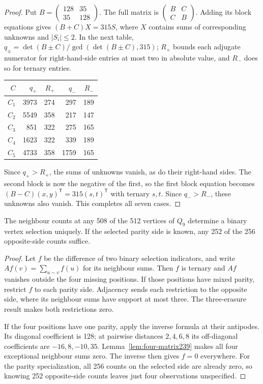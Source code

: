 \begin{proof}
Put $B=\left(\begin{smallmatrix}128&35\\35&128\end{smallmatrix}\right)$.
The full matrix is $\left(\begin{smallmatrix}B&C\\C&B\end{smallmatrix}\right)$.
Adding its block equations gives $(B+C)X=315S$, where $X$ contains
sums of corresponding unknowns and $|S_i|\le2$. In the next table,
$q_\pm=\det(B\pm C)/\gcd(\det(B\pm C),315)$;
$R_+$ bounds each adjugate numerator for right-hand-side entries at
most two in absolute value, and $R_-$ does so for ternary entries.
\begin{center}
\begin{tabular}{rrrrr}
\toprule
$C$ & $q_+$ & $R_+$ & $q_-$ & $R_-$\\
\midrule
$C_1$ & 3973 & 274 & 297 & 189\\
$C_2$ & 5549 & 358 & 217 & 147\\
$C_3$ & 851 & 322 & 275 & 165\\
$C_4$ & 1623 & 322 & 339 & 189\\
$C_5$ & 4733 & 358 & 1759 & 165\\
\bottomrule
\end{tabular}
\end{center}
Since $q_+>R_+$, the sums of unknowns vanish, as do their right-hand
sides. The second block is now the negative of the first, so the first
block equation becomes $(B-C)(x,y)^{\mathsf T}=315(s,t)^{\mathsf T}$
with ternary $s,t$. Since $q_->R_-$, these unknowns also vanish.
This completes all seven cases.
\end{proof}

\begin{proposition}\label{prop:four-erasure239}
The neighbour counts at any 508 of the 512 vertices of $Q_9$ determine
a binary vertex selection uniquely. If the selected parity side is
known, any 252 of the 256 opposite-side counts suffice.
\end{proposition}
\begin{proof}
Let $f$ be the difference of two binary selection indicators, and
write $Af(v)=\sum_{u\sim v}f(u)$ for its neighbour sums. Then $f$ is
ternary and $Af$ vanishes outside the four missing positions.
If those positions have mixed parity, restrict $f$ to each parity
side. Adjacency sends each restriction to the opposite side, where
its neighbour sums have support at most three. The three-erasure
result makes both restrictions zero.

If the four positions have one parity, apply the inverse formula at
their antipodes. Its diagonal coefficient is 128; at pairwise distances
$2,4,6,8$ its off-diagonal coefficients are $-16,8,-10,35$.
Lemma~\ref{lem:four-matrix239} makes all four exceptional neighbour
sums zero. The inverse then gives $f=0$ everywhere. For the parity
specialization, all 256 counts on the selected side are already zero,
so knowing 252 opposite-side counts leaves just four observations
unspecified.
\end{proof}

